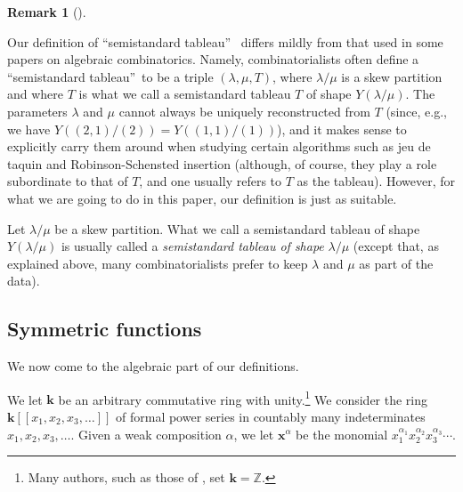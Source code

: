 \documentclass[numbers=enddot,12pt,final,onecolumn,notitlepage]{scrartcl}%
\theoremstyle{definition}
\newtheorem{remk}[theo]{Remark}
\newenvironment{remark}[1][]
{\begin{remk}[#1]\begin{leftbar}}
{\end{leftbar}\end{remk}}
\newenvironment{verlong}{}{}
\newenvironment{vershort}{}{}
\begin{document}
\begin{verlong}
\begin{remark}
Our definition of \textquotedblleft semistandard tableau\textquotedblright%
\ differs mildly from that used in some papers on algebraic combinatorics.
Namely, combinatorialists often define a \textquotedblleft semistandard
tableau\textquotedblright\ to be a triple $\left(  \lambda,\mu,T\right)  $,
where $\lambda/\mu$ is a skew partition and where $T$ is what we call a
semistandard tableau $T$ of shape $Y\left(  \lambda/\mu\right)  $. The
parameters $\lambda$ and $\mu$ cannot always be uniquely reconstructed from
$T$ (since, e.g., we have $Y\left(  \left(  2,1\right)  /\left(  2\right)
\right)  =Y\left(  \left(  1,1\right)  /\left(  1\right)  \right)  $), and it
makes sense to explicitly carry them around when studying certain algorithms
such as jeu de taquin and Robinson-Schensted insertion (although, of course,
they play a role subordinate to that of $T$, and one usually refers to $T$ as
the tableau). However, for what we are going to do in this paper, our
definition is just as suitable.

Let $\lambda/\mu$ be a skew partition. What we call a semistandard tableau of
shape $Y\left(  \lambda/\mu\right)  $ is usually called a \textit{semistandard
tableau of shape }$\lambda/\mu$ (except that, as explained above, many
combinatorialists prefer to keep $\lambda$ and $\mu$ as part of the data).
\end{remark}
\end{verlong}

\subsection{Symmetric functions}

We now come to the algebraic part of our definitions.

\begin{vershort}
We let $\mathbf{k}$ be an arbitrary commutative ring with unity.\footnote{Many
authors, such as those of \cite{LamPyl}, set $\mathbf{k}=\mathbb{Z}$.} We
consider the ring $\mathbf{k}\left[  \left[  x_{1},x_{2},x_{3},\ldots\right]
\right]  $ of formal power series in countably many indeterminates
$x_{1},x_{2},x_{3},\ldots$. Given a weak composition $\alpha$, we let
$\mathbf{x}^{\alpha}$ be the monomial $x_{1}^{\alpha_{1}}x_{2}^{\alpha_{2}%
}x_{3}^{\alpha_{3}}\cdots$.
\end{vershort}
\end{document}
